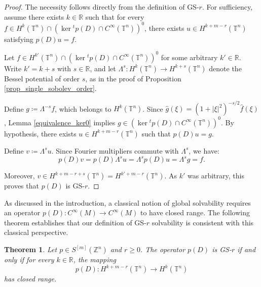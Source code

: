 \documentclass[11pt]{amsart}
\numberwithin{equation}{section}
\newtheorem{theorem}{Theorem}[section]
\theoremstyle{definition}
\begin{document}
	\begin{proof}
		The necessity follows directly from the definition of GS-\( r \). 
		For sufficiency, assume there exists \( k \in \mathbb{R} \) such that for every \( f \in H^k(\mathbb{T}^n) \cap \left( \ker {}^t p(D) \cap C^\infty(\mathbb{T}^n) \right)^0 \), there exists \( u \in H^{k + m - r}(\mathbb{T}^n) \) satisfying \( p(D)u = f \).
		
		Let \( f \in H^{k'}(\mathbb{T}^n) \cap \left( \ker {}^t p(D) \cap C^\infty(\mathbb{T}^n) \right)^0 \) for some arbitrary \( k' \in \mathbb{R} \). Write \( k' = k + s \) with \( s \in \mathbb{R} \), and let \( \Lambda^s: H^k(\mathbb{T}^n) \to H^{k+s}(\mathbb{T}^n) \) denote the Bessel potential of order \( s \), as in the proof of Proposition \ref{prop_single_sobolev_order}. 
		
		Define \( g \coloneqq \Lambda^{-s} f \), which belongs to \( H^k(\mathbb{T}^n) \).	Since \( \widehat{g}(\xi) = (1 + |\xi|^2)^{-s/2} \widehat{f}(\xi) \), Lemma \ref{equivalence_ker0} implies \( g \in \left( \ker {}^t p(D) \cap C^\infty(\mathbb{T}^n) \right)^0 \). By hypothesis, there exists \( u \in H^{k + m - r}(\mathbb{T}^n) \) such that \( p(D)u = g \).
		
		Define \( v \coloneqq \Lambda^s u \). Since Fourier multipliers commute with \( \Lambda^s \), we have:
		\[
		p(D)v = p(D) \Lambda^s u = \Lambda^s p(D)u = \Lambda^s g = f.
		\]

		Moreover, \( v \in H^{k + m - r + s}(\mathbb{T}^n) = H^{k' + m - r}(\mathbb{T}^n) \). As \( k' \) was arbitrary, this proves that \( p(D) \) is GS-\( r \).
	\end{proof}
	
	As discussed in the introduction, a classical notion of global solvability requires an operator \( p(D): C^\infty(M) \to C^\infty(M) \) to have closed range. The following theorem establishes that our definition of GS-\( r \) solvability is consistent with this classical perspective.
	
	\begin{theorem}\label{teoGS-closed}
		Let \( p \in S^{[m]}(\mathbb{Z}^n) \) and \( r \geq 0 \). The operator \( p(D) \) is GS-\( r \) if and only if for every \( k \in \mathbb{R} \), the mapping
		\[
		p(D): H^{k + m - r}(\mathbb{T}^n) \to H^k(\mathbb{T}^n)
		\]
		has closed range.
	\end{theorem}
	
\end{document}
